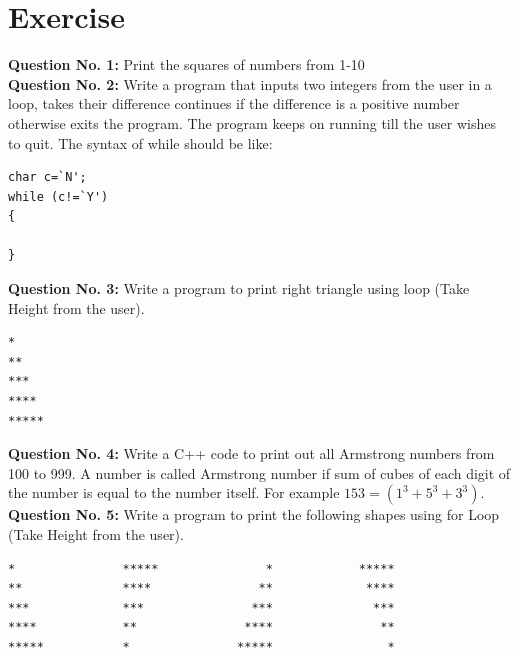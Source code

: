 \documentclass[12pt,a4paper]{article}
\begin{document}
\section{Exercise}
\textbf{Question No. 1:} Print the squares of numbers from 1-10\\
\noindent\textbf{Question No. 2:} Write a program that inputs two integers from the user in a loop, takes their difference continues if the difference is a positive number otherwise exits the program. The program keeps on running till the user wishes to quit. 
The syntax of while should be like:
\begin{verbatim}
char c=`N';
while (c!=`Y')
{

}
\end{verbatim}
\noindent\textbf{Question No. 3:} Write a program to print right triangle using loop (Take Height from the user).
\begin{verbatim}
*
**
***
****
*****
\end{verbatim}
\noindent\textbf{Question No. 4:} Write a C++ code to print out all Armstrong numbers from 100 to 999. A number is called Armstrong number if sum of cubes of each digit of the number is equal to the number itself. For example $153=(1^3+5^3+3^3)$.
\noindent\textbf{Question No. 5:} Write a program to print the following shapes using for Loop (Take Height from the user). 
\begin{verbatim}
*           	*****               *       	 *****
**          	****               **       	  ****
***         	***               ***       	   ***
****        	**               ****       	    **
*****       	*               *****       	     *
\end{verbatim}
\end{document}
